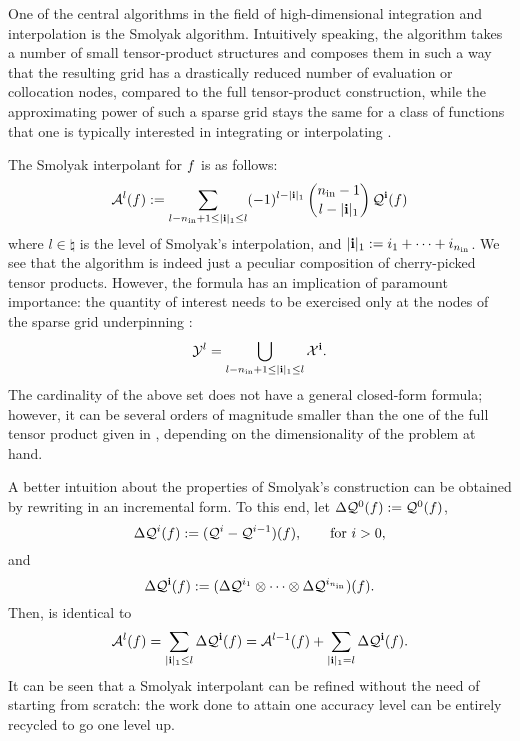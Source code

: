 One of the central algorithms in the field of high-dimensional integration and
interpolation is the Smolyak algorithm. Intuitively speaking, the algorithm
takes a number of small tensor-product structures and composes them in such a
way that the resulting grid has a drastically reduced number of evaluation or
collocation nodes, compared to the full tensor-product construction, while the
approximating power of such a sparse grid stays the same for a class of
functions that one is typically interested in integrating or interpolating
\cite{klimke2006}.

The Smolyak interpolant for $f$ is as follows:
\begin{equation} \elab{smolyak}
  \smolyak{l}(\f) := \sum_{l - \nin + 1 \leq |\vi|_1 \leq l} (-1)^{l - |\vi|_1} \, {\nin - 1 \choose l - |\vi|_1} \, \tensor{\vi}(\f)
\end{equation}
where $l \in \natural$ is the level of Smolyak's interpolation, and $|\mathbf{i}|_1 :=
i_1 + \dots + i_{n_\text{in}}$. We see that the algorithm is indeed just a peculiar
composition of cherry-picked tensor products. However, the formula has an
implication of paramount importance: the quantity of interest needs to be
exercised only at the nodes of the sparse grid underpinning :
\begin{equation} \elab{smolyak-grid}
  \Y^l = \bigcup_{l - \nin + 1 \leq |\vi|_1 \leq l} \X^\vi.
\end{equation}
The cardinality of the above set does not have a general closed-form formula;
however, it can be several orders of magnitude smaller than the one of the full
tensor product given in , depending on the
dimensionality of the problem at hand.

A better intuition about the properties of Smolyak's construction can be
obtained by rewriting  in an incremental form. To this end, let
$\Delta\mathcal{Q}^{0}(f) := \mathcal{Q}^{0}(f)$,
\begin{equation} \elab{tensor-delta-1d}
  \Delta\tensor{i}(\f) := (\tensor{i} - \tensor{i - 1})(\f), \qquad \text{for $i > 0$},
\end{equation}
and
\begin{equation} \elab{tensor-delta}
  \Delta\tensor{\vi}(\f) := (\Delta\tensor{i_1} \otimes \cdots \otimes \Delta\tensor{i_\nin})(\f).
\end{equation}
Then,  is identical to
\begin{equation} \elab{smolyak-incremental}
  \smolyak{l}(\f) = \sum_{|\vi|_1 \leq l} \Delta\tensor{\vi}(\f) = \smolyak{l - 1}(\f) + \sum_{|\vi|_1 = l} \Delta\tensor{\vi}(\f).
\end{equation}
It can be seen that a Smolyak interpolant can be refined without the need of
starting from scratch: the work done to attain one accuracy level can be
entirely recycled to go one level up.

